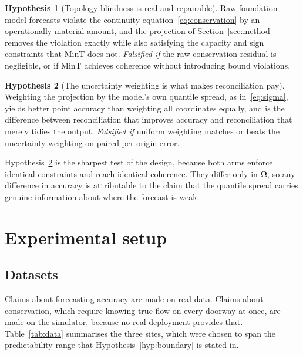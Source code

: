 \documentclass[11pt]{article}
\theoremstyle{plain}
\theoremstyle{definition}
\newtheorem{hypothesis}{Hypothesis}
\theoremstyle{remark}
\newcommand{\bOm}{\bm{\Omega}}
\begin{document}
\begin{hypothesis}[Topology-blindness is real and repairable]
\label{hyp:coherence}
Raw foundation model forecasts violate the continuity equation~\eqref{eq:conservation} by an operationally material amount, and the projection of Section~\ref{sec:method} removes the violation exactly while also satisfying the capacity and sign constraints that MinT does not.
\emph{Falsified if} the raw conservation residual is negligible, or if MinT achieves coherence without introducing bound violations.
\end{hypothesis}

\begin{hypothesis}[The uncertainty weighting is what makes reconciliation pay]
\label{hyp:weights}
Weighting the projection by the model's own quantile spread, as in~\eqref{eq:sigma}, yields better point accuracy than weighting all coordinates equally, and is the difference between reconciliation that improves accuracy and reconciliation that merely tidies the output.
\emph{Falsified if} uniform weighting matches or beats the uncertainty weighting on paired per-origin error.
\end{hypothesis}

Hypothesis~\ref{hyp:weights} is the sharpest test of the design, because both arms enforce identical constraints and reach identical coherence. They differ only in $\bOm$, so any difference in accuracy is attributable to the claim that the quantile spread carries genuine information about where the forecast is weak.

\section{Experimental setup}
\label{sec:setup}

\subsection{Datasets}

Claims about forecasting accuracy are made on real data. Claims about conservation, which require knowing true flow on every doorway at once, are made on the simulator, because no real deployment provides that. Table~\ref{tab:data} summarises the three sites, which were chosen to span the predictability range that Hypothesis~\ref{hyp:boundary} is stated in.
\end{document}
